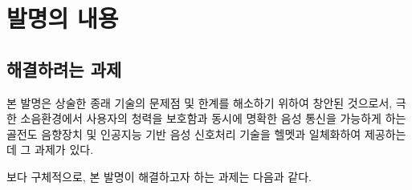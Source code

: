 \documentclass{article}
\begin{document}
\newpage


\section{발명의 내용}

\subsection{해결하려는 과제}

본 발명은 상술한 종래 기술의 문제점 및 한계를 해소하기 위하여 창안된 것으로서, 극한 소음환경에서 사용자의 청력을 보호함과 동시에 명확한 음성 통신을 가능하게 하는 골전도 음향장치 및 인공지능 기반 음성 신호처리 기술을 헬멧과 일체화하여 제공하는 데 그 과제가 있다.

보다 구체적으로, 본 발명이 해결하고자 하는 과제는 다음과 같다.
\end{document}
